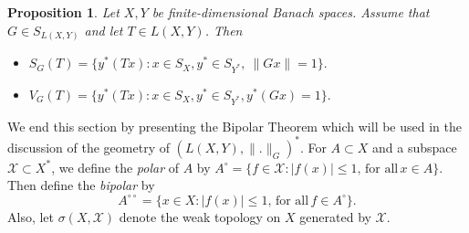 \documentclass[12pt]{amsart}
\newtheorem{proposition}[theorem]{Proposition}
\theoremstyle{definition}
\numberwithin{equation}{section}
\begin{document}
	
	\begin{proposition}\label{P2.5}
		Let $X, Y$ be finite-dimensional Banach spaces. Assume that $G\in S_{L(X,Y)}$ and let $T\in L(X,Y)$. Then
		\begin{itemize}
			\item[(i)] $S_G(T)=\Big\{ y^*(Tx):x\in S_X, y^*\in S_{Y^*},\ \|Gx\|= 1 \Big\}.$
			\item[(ii)] $V_G(T)=\Big\{y^*(Tx):x\in S_X, y^*\in S_{Y^*}, y^*(Gx)= 1 \Big\}.$
		\end{itemize}
	\end{proposition}

    We end this section by presenting the Bipolar Theorem which will be used in the discussion of the geometry of $(L(X, Y), \|.\|_G)^*$. For $A \subset X$ and a subspace $\mathcal{X} \subset X^*$, we define the \emph{polar} of $A$ by $A^\circ = \{ f \in \mathcal{X} : |f(x)| \le 1,\, \text{for all}\, x \in A \}.$ Then define the \emph{bipolar} by 
    \[
    A^{\circ\circ} = \{ x \in X : |f(x)| \le 1,\,\text{for all}\, f \in A^\circ \}.
    \]
    Also, let $\sigma(X,\mathcal{X})$ denote the weak topology on $X$ generated by $\mathcal{X}$.
\end{document}
